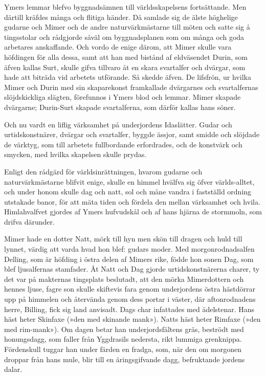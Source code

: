 Ymers lemmar blefvo byggnadsämnen till världsskapelsens fortsättande.
Men därtill kräfdes många och flitiga händer. Då samlade sig de älste
höghelige gudarne och Mimer och de andre naturvärkmästarne till möten
och satte sig å tingsstolar och rådgjorde såväl om byggnadsplanen som om
många och goda arbetares anskaffande. Och vordo de enige därom, att
Mimer skulle vara höfdingen för alla dessa, samt att han med bistånd af
eldväsendet Durin, som äfven kallas Surt, skulle gifva tillvaro åt en
skara svartalfer och dvärgar,
som hade att biträda vid arbetets utförande. Så skedde äfven. De
lifsfrön, ur hvilka Mimer och Durin med sin skaparekonst framkallade
dvärgarnes och svartalfernas slöjdskickliga slägten, förefunnos i Ymers
blod och lemmar. Mimer skapade dvärgarne; Durin-Surt skapade
svartalferna, som därför kallas hans söner.

Och nu vardt en liflig värksamhet på underjordens Idaslätter. Gudar och
urtidskonstnärer, dvärgar och svartalfer, byggde ässjor, samt smidde och
slöjdade de värktyg, som till arbetets fullbordande erfordrades, och de
konstvärk och smycken, med hvilka skapelsen skulle prydas.

Enligt den rådgärd för världsinrättningen, hvarom gudarne och
naturvärkmästarne blifvit enige, skulle en himmel hvälfva sig öfver
världs-alltet, och under honom skulle dag och natt, sol och måne vandra
i fastställd ordning utstakade banor, för att mäta tiden och fördela den
mellan värksamhet och hvila. Himlahvalfvet gjordes af Ymers hufvudskål
och af hans hjärna de stormmoln, som drifva därunder.

Mimer hade en dotter Natt, mörk till hyn men skön till dragen och huld
till lynnet, värdig att varda hvad hon blef: gudars moder. Med
morgonrodnadsalfen Delling, som är höfding i östra delen af Mimers rike,
födde hon sonen Dag, som blef ljusalfernas stamfader. Åt Natt och Dag
gjorde urtidskonstnärerna charer, ty det var på makternas tingsplats
beslutadt, att den mörka Mimerdottern och hennes ljuse, fagre son skulle
skiftevis fara genom underjordens östra hästdörrar upp på himmelen och
återvända genom dess portar i väster, där aftonrodnadens herre, Billing,
fick sig land anvisadt. Dags char infattades med ädelstenar. Hans häst
heter Skinfaxe (»den med skinande mank»). Natts häst heter Rimfaxe (»den
med rim-mank»). Om dagen betar han underjordsfältens gräs, beströdt med
honungsdagg, som faller från Yggdrasils nedersta, rikt lummiga
grenknippa. Fördenskull tuggar han under färden en fradga, som, när den
om morgonen droppar från hans mule, blir till en äringsgifvande dagg,
befruktande jordens dalar.


